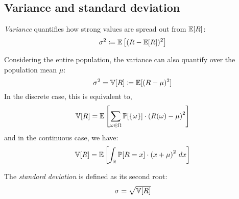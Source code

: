 \subsection{Variance and standard deviation}
\label{sec:bp-var-sd}
%
\begin{definition}
  \emph{Variance} quantifies how strong values are spread out from $\mathbb E[R]$: %
  \[ \sigma^2 \coloneqq \mathbb E\left[(R - \mathbb E[R])^2\right] \]
\end{definition}
Considering the entire population, the variance can also quantify over the population mean $\mu$:
\[ \sigma^2 = \mathbb V[R] \coloneqq \mathbb E[(R - \mu)^2] \]
In the discrete case, this is equivalent to,
\[ \mathbb V[R] = \mathbb E\left[\sum_{\omega \in \Omega} \mathbb P[\left\{\omega\right\}] \cdot \left(R(\omega) - \mu\right)^2\right] \]
and in the continuous case, we have:
\[ \mathbb V[R] = \mathbb E\left[\int_{\mathbb R} \mathbb P[R=x] \cdot \left(x + \mu\right)^2 \, dx\right] \]
\begin{definition}
  The \emph{standard deviation} is defined as its second root:
  \[ \sigma = \sqrt{\mathbb V[R]} \]
\end{definition}

